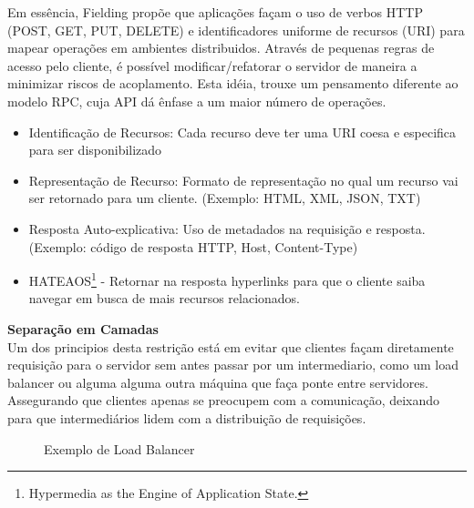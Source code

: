 Em essência, Fielding propõe que aplicações façam o uso de verbos HTTP (POST, GET, PUT, DELETE) e identificadores uniforme de recursos (URI) para mapear operações em ambientes distribuidos. Através de pequenas regras de acesso pelo cliente, é possível modificar/refatorar o servidor de maneira a minimizar riscos de acoplamento. Esta idéia, trouxe um pensamento diferente ao modelo RPC, cuja API dá ênfase a um maior número de operações. \cite{Fielding2000}

\begin{itemize}[noitemsep]
\item Identificação de Recursos: Cada recurso deve ter uma URI coesa e especifica para ser disponibilizado
\item Representação de Recurso: Formato de representação no qual um recurso vai ser retornado para um cliente. (Exemplo: HTML, XML, JSON, TXT)
\item Resposta Auto-explicativa: Uso de metadados na requisição e resposta. (Exemplo: código de resposta HTTP, Host, Content-Type)
\item HATEAOS\footnote{
  Hypermedia as the Engine of Application State.
} - Retornar na resposta hyperlinks para que o cliente saiba navegar em busca de mais recursos relacionados.
\end{itemize}

\textbf{Separação em Camadas} \\

Um dos principios desta restrição está em evitar que clientes façam diretamente requisição para o servidor sem antes passar por um intermediario, como um load balancer ou alguma alguma outra máquina que faça ponte entre servidores. Assegurando que clientes apenas se preocupem com a comunicação, deixando para que intermediários lidem com a distribuição de requisições. \cite{Fielding2000}

\begin{figure}[H]
  \centering
  \caption{Exemplo de Load Balancer}
\end{figure}

